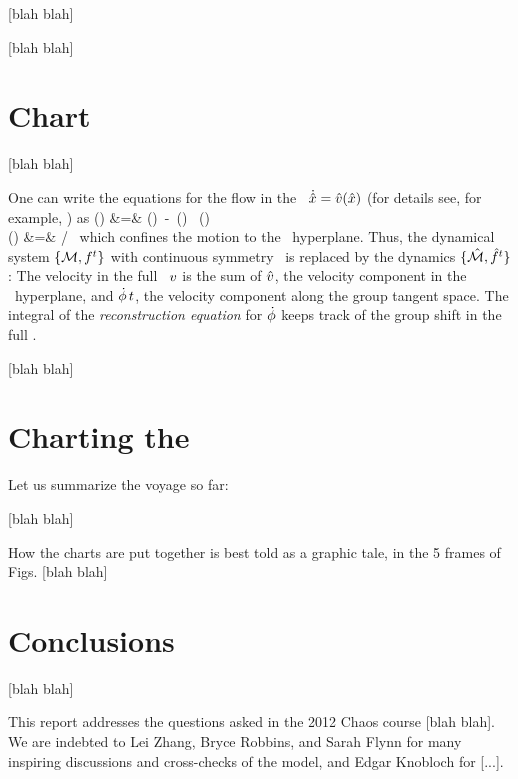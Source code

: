 \documentclass[aip,cha,
secnumarabic,
nofootinbib, tightenlines,
nobibnotes, showkeys, showpacs,
groupedaddress,
preprint,%
]{revtex4-1}
\begin{document}
 [blah blah]

 [blah blah]

\section{Chart}
\label{s:slice}

 [blah blah]

One can write the equations for the flow in the \reducedsp\
$\dot{\hat{x}} = \hat{v}(\hat{x})$ (for details see, for example,
\refref{DasBuch}) as
\bea
\velRed(\sspRed) &=& \vel(\sspRed)
     \,-\, \dot{\gSpace}(\sspRed) \, \groupTan(\sspRed)
\label{2modesEqMotMFrame}\\
\dot{\gSpace}(\sspRed) &=& \braket{\vel(\sspRed)}{\sliceTan{}}
                       /\braket{\groupTan(\sspRed)}{\sliceTan{}}
\,
\label{2modesreconstrEq}
\eea
which confines the motion to the \slice\ hyperplane. Thus, the dynamical
system $\{{\cal M},f^t\}$ with continuous symmetry \Group\ is replaced by
the {\reducedsp} dynamics $\{\hat{\cal M},\hat{f}^t\}$: The velocity in the
full \statesp\ $v$ is the sum of $\hat{v}$, the velocity component in
the \slice\ hyperplane, and $\dot{{\bf \phi}}\,t$, the velocity
component along the group tangent space. The integral of the {\em
reconstruction equation} for $\dot{{\bf \phi}}$ keeps track of the group
shift in the full \statesp.


 [blah blah]

\section{Charting the \slice}
\label{s:chart}

Let us summarize the voyage so far:

 [blah blah]


How the charts are put together is best told as a graphic tale, in the 5
frames of Figs.  [blah blah]



\section{Conclusions}
\label{s:concl}

 [blah blah]

\begin{acknowledgments}
This report addresses the questions asked in the  2012 Chaos course
[blah blah].
We are indebted to
Lei Zhang, Bryce Robbins,
and
Sarah Flynn
for many inspiring discussions and cross-checks of the model,
and Edgar Knobloch for [...].
\end{acknowledgments}
\end{document}
